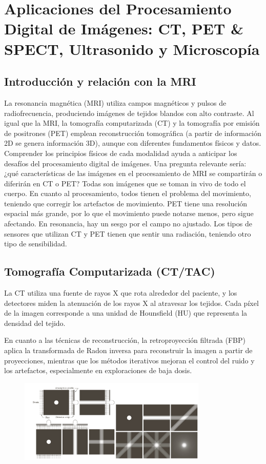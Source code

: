 \chapter{Aplicaciones del Procesamiento Digital de Imágenes: CT, PET \& SPECT, Ultrasonido y Microscopía}
\section{Introducción y relación con la MRI}

La resonancia magnética (MRI) utiliza campos magnéticos y pulsos de radiofrecuencia, produciendo imágenes de tejidos blandos con alto contraste. Al igual que la MRI, la tomografía computarizada (CT) y la tomografía por emisión de positrones (PET) emplean reconstrucción tomográfica (a partir de información 2D se genera información 3D), aunque con diferentes fundamentos físicos y datos. Comprender los principios físicos de cada modalidad ayuda a anticipar los desafíos del procesamiento digital de imágenes. Una pregunta relevante sería: ¿qué características de las imágenes en el procesamiento de MRI se compartirán o diferirán en CT o PET? Todas son imágenes que se toman in vivo de todo el cuerpo. En cuanto al procesamiento, todos tienen el problema del movimiento, teniendo que corregir los artefactos de movimiento. PET tiene una resolución espacial más grande, por lo que el movimiento puede notarse menos, pero sigue afectando. En resonancia, hay un sesgo por el campo no ajustado. Los tipos de sensores que utilizan CT y PET tienen que sentir una radiación, teniendo otro tipo de sensibilidad.

\section{Tomografía Computarizada (CT/TAC)}

La CT utiliza una fuente de rayos X que rota alrededor del paciente, y los detectores miden la atenuación de los rayos X al atravesar los tejidos. Cada píxel de la imagen corresponde a una unidad de Hounsfield (HU) que representa la densidad del tejido.

En cuanto a las técnicas de reconstrucción, la retroproyección filtrada (FBP) aplica la transformada de Radon inversa para reconstruir la imagen a partir de proyecciones, mientras que los métodos iterativos mejoran el control del ruido y los artefactos, especialmente en exploraciones de baja dosis.

\begin{figure}[h]
\centering
\includegraphics[width = 0.8\textwidth]{figs/backprojection.png}
\end{figure}

